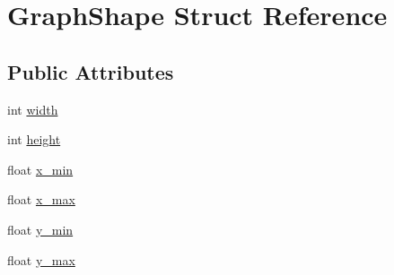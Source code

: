 \hypertarget{structGraphShape}{\section{Graph\-Shape Struct Reference}
\label{structGraphShape}
}
\subsection*{Public Attributes}
\begin{DoxyCompactItemize}
\item 
int \hyperlink{structGraphShape_ad3178b15a9e77e1090d48c82d4638f9b}{width}
\item 
int \hyperlink{structGraphShape_a607700d99c4abf129b8d16faf0d3b25c}{height}
\item 
float \hyperlink{structGraphShape_a1884e3c2754221989d63df9ac4ce4d9a}{x\-\_\-min}
\item 
float \hyperlink{structGraphShape_a3b00b051c184055de820b55bf4c18501}{x\-\_\-max}
\item 
float \hyperlink{structGraphShape_ab8dd54492c937c50ea4251830a29bde3}{y\-\_\-min}
\item 
float \hyperlink{structGraphShape_aed350263077af239c11e08625e1af5d7}{y\-\_\-max}
\end{DoxyCompactItemize}


